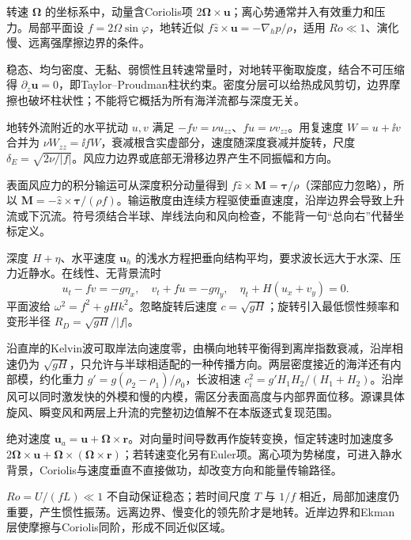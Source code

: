 转速 $\boldsymbol\Omega$ 的坐标系中，动量含Coriolis项 $2\boldsymbol\Omega\times\mathbf u$；离心势通常并入有效重力和压力。局部平面设 $f=2\Omega\sin\varphi$，地转近似 $f\hat z\times\mathbf u=-\nabla_h p/\rho$，适用 $Ro\ll1$、演化慢、远离强摩擦边界的条件。

稳态、均匀密度、无黏、弱惯性且转速常量时，对地转平衡取旋度，结合不可压缩得 $\partial_z\mathbf u=0$，即Taylor--Proudman柱状约束。密度分层可以给热成风剪切，边界摩擦也破坏柱状性；不能将它概括为所有海洋流都与深度无关。

地转外流附近的水平扰动 $u,v$ 满足 $-fv=\nu u_{zz}$、$fu=\nu v_{zz}$。用复速度 $W=u+\ii v$ 合并为 $\nu W_{zz}=\ii fW$，衰减根含实虚部分，速度随深度衰减并旋转，尺度 $\delta_E=\sqrt{2\nu/|f|}$。风应力边界或底部无滑移边界产生不同振幅和方向。

表面风应力的积分输运可从深度积分动量得到 $f\hat z\times\mathbf M=\boldsymbol\tau/\rho$（深部应力忽略），所以 $\mathbf M=-\hat z\times\boldsymbol\tau/(\rho f)$。输运散度由连续方程驱使垂直速度，沿岸边界会导致上升流或下沉流。符号须结合半球、岸线法向和风向检查，不能背一句“总向右”代替坐标定义。

深度 $H+\eta$、水平速度 $\mathbf u_h$ 的浅水方程把垂向结构平均，要求波长远大于水深、压力近静水。在线性、无背景流时
\[
u_t-fv=-g\eta_x,\quad v_t+fu=-g\eta_y,\quad \eta_t+H(u_x+v_y)=0.
\]
平面波给 $\omega^2=f^2+gHk^2$。忽略旋转后速度 $c=\sqrt{gH}$；旋转引入最低惯性频率和变形半径 $R_D=\sqrt{gH}/|f|$。

沿直岸的Kelvin波可取岸法向速度零，由横向地转平衡得到离岸指数衰减，沿岸相速仍为 $\sqrt{gH}$，只允许与半球相适配的一种传播方向。两层密度接近的海洋还有内部模，约化重力 $g'=g(\rho_2-\rho_1)/\rho_0$，长波相速 $c_i^2=g'H_1H_2/(H_1+H_2)$。沿岸风可以同时激发快的外模和慢的内模，需区分表面高度与内部界面位移。源课具体旋风、瞬变风和两层上升流的完整初边值解不在本版逐式复现范围。

绝对速度 $\mathbf u_a=\mathbf u+\boldsymbol\Omega\times\mathbf r$。对向量时间导数再作旋转变换，恒定转速时加速度多 $2\boldsymbol\Omega\times\mathbf u+\boldsymbol\Omega\times(\boldsymbol\Omega\times\mathbf r)$；若转速变化另有Euler项。离心项为势梯度，可进入静水背景，Coriolis与速度垂直不直接做功，却改变方向和能量传输路径。

$Ro=U/(fL)\ll1$ 不自动保证稳态；若时间尺度 $T$ 与 $1/f$ 相近，局部加速度仍重要，产生惯性振荡。远离边界、慢变化的领先阶才是地转。近岸边界和Ekman层使摩擦与Coriolis同阶，形成不同近似区域。

